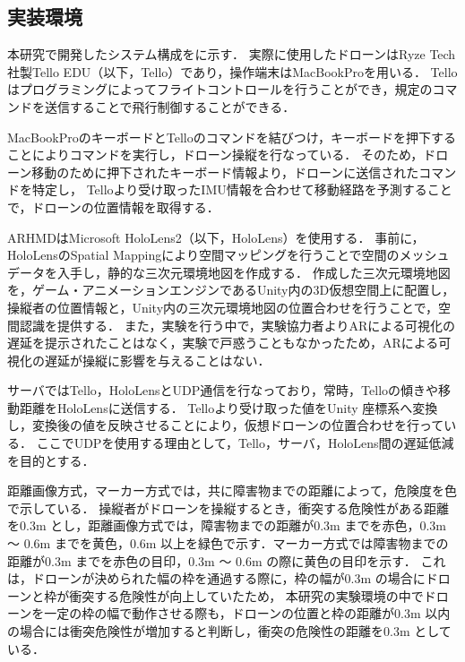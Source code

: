 \documentclass[submit, sigrecommended]{ipsj}
\begin{document}
\subsection{実装環境}
本研究で開発したシステム構成をに示す．
実際に使用したドローンはRyze Tech社製Tello EDU（以下，Tello）であり，操作端末はMacBookProを用いる．
Telloはプログラミングによってフライトコントロールを行うことができ，規定のコマンドを送信することで飛行制御することができる．
\par
MacBookProのキーボードとTelloのコマンドを結びつけ，キーボードを押下することによりコマンドを実行し，ドローン操縦を行なっている．
そのため，ドローン移動のために押下されたキーボード情報より，ドローンに送信されたコマンドを特定し，
Telloより受け取ったIMU情報を合わせて移動経路を予測することで，ドローンの位置情報を取得する．
\par
ARHMDはMicrosoft HoloLens2（以下，HoloLens）を使用する．
事前に，HoloLensのSpatial Mappingにより空間マッピングを行うことで空間のメッシュデータを入手し，静的な三次元環境地図を作成する．
作成した三次元環境地図を，ゲーム・アニメーションエンジンであるUnity内の3D仮想空間上に配置し，操縦者の位置情報と，Unity内の三次元環境地図の位置合わせを行うことで，空間認識を提供する．
また，実験を行う中で，実験協力者よりARによる可視化の遅延を提示されたことはなく，実験で戸惑うこともなかったため，ARによる可視化の遅延が操縦に影響を与えることはない．
\par
サーバではTello，HoloLensとUDP通信\cite{web-udp}を行なっており，常時，Telloの傾きや移動距離をHoloLensに送信する．
Telloより受け取った値をUnity 座標系へ変換し，変換後の値を反映させることにより，仮想ドローンの位置合わせを行っている．
ここでUDPを使用する理由として，Tello，サーバ，HoloLens間の遅延低減を目的とする．
\par
距離画像方式，マーカー方式では，共に障害物までの距離によって，危険度を色で示している．
操縦者がドローンを操縦するとき，衝突する危険性がある距離を0.3m とし\cite{tech-01}，距離画像方式では，障害物までの距離が0.3m までを赤色，0.3m 〜 0.6m までを黄色，0.6m 以上を緑色で示す．マーカー方式では障害物までの距離が0.3m までを赤色の目印，0.3m 〜 0.6m の際に黄色の目印を示す．
これは，ドローンが決められた幅の枠を通過する際に，枠の幅が0.3m の場合にドローンと枠が衝突する危険性が向上していたため\cite{tech-01}，
本研究の実験環境の中でドローンを一定の枠の幅で動作させる際も，ドローンの位置と枠の距離が0.3m 以内の場合には衝突危険性が増加すると判断し，衝突の危険性の距離を0.3m としている．
\end{document}
